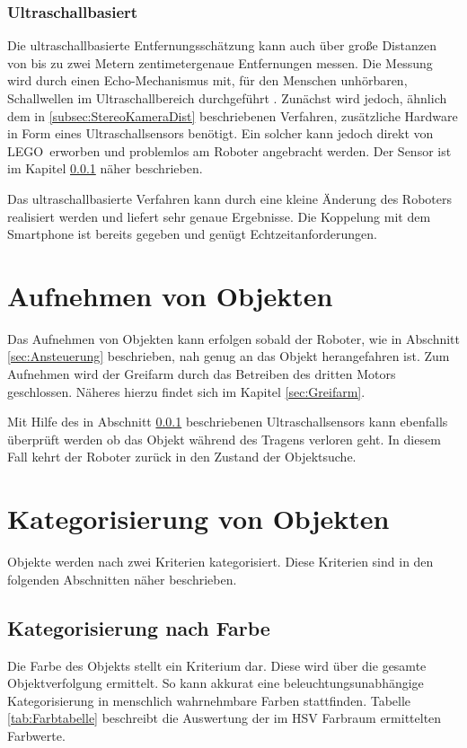 \subsubsection{Ultraschallbasiert}
\label{subsec:Ultraschall}

Die ultraschallbasierte Entfernungsschätzung kann auch über große Distanzen von bis zu zwei Metern zentimetergenaue Entfernungen messen. Die Messung wird durch einen Echo-Mechanismus mit, für den Menschen unhörbaren, Schallwellen im Ultraschallbereich durchgeführt \cite{hertzberg2012mobile}. Zunächst wird jedoch, ähnlich dem in \ref{subsec:StereoKameraDist} beschriebenen Verfahren, zusätzliche Hardware in Form eines Ultraschallsensors benötigt. Ein solcher kann jedoch direkt von LEGO\texttrademark\ erworben und problemlos am Roboter angebracht werden. Der Sensor ist im Kapitel \ref{subsec:Ultraschall} näher beschrieben.

Das ultraschallbasierte Verfahren kann durch eine kleine Änderung des Roboters realisiert werden und liefert sehr genaue Ergebnisse. Die Koppelung mit dem Smartphone ist bereits gegeben und genügt Echtzeitanforderungen.

\section{Aufnehmen von Objekten}
\label{sec:Aufnehmen}

Das Aufnehmen von Objekten kann erfolgen sobald der Roboter, wie in Abschnitt \ref{sec:Ansteuerung} beschrieben, nah genug an das Objekt herangefahren ist. Zum Aufnehmen wird der Greifarm durch das Betreiben des dritten Motors geschlossen. Näheres hierzu findet sich im Kapitel \ref{sec:Greifarm}. 

Mit Hilfe des in Abschnitt \ref{subsec:Ultraschall} beschriebenen Ultraschallsensors kann ebenfalls überprüft werden ob das Objekt während des Tragens verloren geht. In diesem Fall kehrt der Roboter zurück in den Zustand der Objektsuche.

\section{Kategorisierung von Objekten}

Objekte werden nach zwei Kriterien kategorisiert. Diese Kriterien sind in den folgenden Abschnitten näher beschrieben.

\subsection{Kategorisierung nach Farbe}
Die Farbe des Objekts stellt ein Kriterium dar. Diese wird über die gesamte Objektverfolgung ermittelt. So kann akkurat eine beleuchtungsunabhängige Kategorisierung in menschlich wahrnehmbare Farben stattfinden. Tabelle \ref{tab:Farbtabelle} beschreibt die Auswertung der im HSV Farbraum ermittelten Farbwerte.

